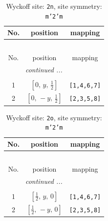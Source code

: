 \documentclass[fleqn,8pt]{jsarticle}
\begin{document}
\begin{longtable}{ccc}
\caption{Wyckoff site: {\tt 2n}, site symmetry: {\tt m'2'm}}
 \\
 \hline \hline
No. & position & mapping \\ \hline \endfirsthead

\multicolumn{2}{l}{\tablename\ \thetable{}} \\
 \hline \hline
No. & position & mapping \\ \hline \endhead

 \hline \hline
\multicolumn{2}{r}{\footnotesize\it continued ...} \\ \endfoot

 \hline \hline
\multicolumn{2}{r}{} \\ \endlastfoot

1 & $\left[ 0,\, y,\, \frac{1}{2} \right]$ & {\tt [1,4,6,7]} \\ \hline
2 & $\left[ 0,\, - y,\, \frac{1}{2} \right]$ & {\tt [2,3,5,8]} \\
\end{longtable}
\renewcommand{\arraystretch}{1.2}
\begin{longtable}{ccc}
\caption{Wyckoff site: {\tt 2o}, site symmetry: {\tt m'2'm}}
 \\
 \hline \hline
No. & position & mapping \\ \hline \endfirsthead

\multicolumn{2}{l}{\tablename\ \thetable{}} \\
 \hline \hline
No. & position & mapping \\ \hline \endhead

 \hline \hline
\multicolumn{2}{r}{\footnotesize\it continued ...} \\ \endfoot

 \hline \hline
\multicolumn{2}{r}{} \\ \endlastfoot

1 & $\left[ \frac{1}{2},\, y,\, 0 \right]$ & {\tt [1,4,6,7]} \\ \hline
2 & $\left[ \frac{1}{2},\, - y,\, 0 \right]$ & {\tt [2,3,5,8]} \\
\end{longtable}
\renewcommand{\arraystretch}{1.2}
\end{document}

